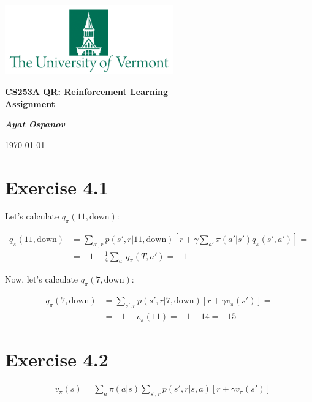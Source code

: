 \documentclass[12pt]{article}
\begin{document}
    \begin{center}
        \includegraphics[height=3cm]{pics/UVM.png}

        {\large\textbf{
            CS253A QR: Reinforcement Learning \\ Assignment 
        }}

        \vspace{0.3cm}

        \textit{\textbf{Ayat Ospanov}}

        \today
    \end{center}

    \tableofcontents

    \section{Exercise 4.1}
        Let's calculate $q_\pi(11,\text{down}):$

        \begin{align*}
            q_\pi(11,\text{down}) &= \sum\limits_{s',r} p(s',r|11,\text{down})[r +
            \gamma \sum\limits_{a'} \pi(a'|s') q_\pi(s',a')] =\\
            & = -1 + \frac{1}{4} \sum\limits_{a'} q_\pi(T,a') = -1
        \end{align*}

        Now, let's calculate $q_\pi(7, \text{down})$:

        \begin{align*}
            q_\pi(7,\text{down}) &= \sum\limits_{s',r} p(s',r|7,\text{down})[r +
            \gamma v_\pi(s')] =\\
            & = -1 + v_\pi(11) = -1 - 14 = -15
        \end{align*}

    \section{Exercise 4.2}
        \begin{align*}
            &v_\pi(s) = \sum\limits_a \pi(a|s)\sum\limits_{s',r} p(s',r|s,a)[r +
            \gamma v_\pi(s')]\\
        \end{align*}
\end{document}
